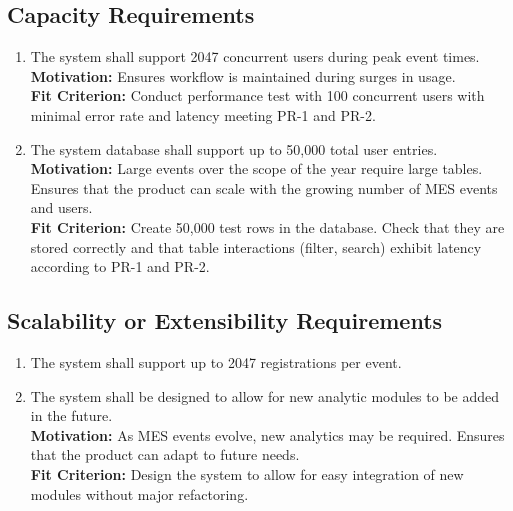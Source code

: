\documentclass[12pt]{article}
\begin{document}
\subsection{Capacity Requirements}
\begin{enumerate}[label=\bfseries CR-\arabic*:, wide=0pt, leftmargin=*]
  \item The system shall support 2047 concurrent users during peak event times.\\
  {\bf Motivation:} Ensures workflow is maintained during surges in usage.\\
  {\bf Fit Criterion:} Conduct performance test with 100 concurrent users with minimal error rate and latency meeting PR-1 and PR-2.
  \item The system database shall support up to 50,000 total user entries.\\
  {\bf Motivation:} Large events over the scope of the year require large tables. Ensures that the product can scale with the growing number of MES events and users.\\
  {\bf Fit Criterion:} Create 50,000 test rows in the database. Check that they are stored correctly and that table interactions (filter, search) exhibit latency according to PR-1 and PR-2.
\end{enumerate}

\subsection{Scalability or Extensibility Requirements}
\begin{enumerate}[label=\bfseries SE-\arabic*:, wide=0pt, leftmargin=*]
  \item \label{PSER1} The system shall support up to 2047 registrations per event.
  \item \label{PSER2} The system shall be designed to allow for new analytic modules to be added in the future.\\
  {\bf Motivation:} As MES events evolve, new analytics may be required. Ensures that the product can adapt to future needs.\\
  {\bf Fit Criterion:} Design the system to allow for easy integration of new modules without major refactoring.
\end{enumerate}
\end{document}
